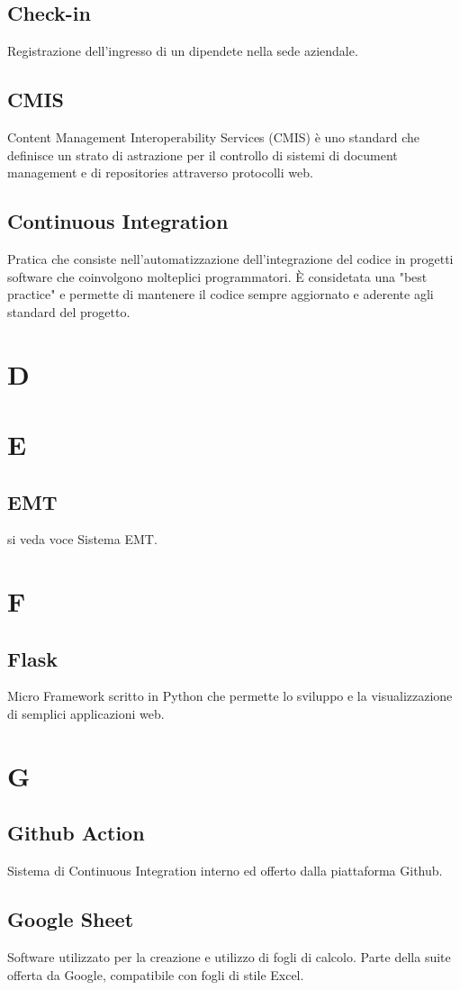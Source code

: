 \subsection{Check-in}
Registrazione dell'ingresso di un dipendete nella sede aziendale.
\subsection{CMIS}
Content Management Interoperability Services (CMIS) è uno standard che definisce un strato di astrazione per il controllo di
sistemi di document management e di repositories attraverso protocolli web.
\subsection{Continuous Integration}
Pratica che consiste nell'automatizzazione dell'integrazione del codice in progetti software che coinvolgono
molteplici programmatori. È considetata una "best practice" e permette di mantenere il codice sempre aggiornato e 
aderente agli standard del progetto.
\newpage
\section{D}
\section{E}
\subsection{EMT}
si veda voce Sistema EMT.
\newpage
\section{F}
\subsection{Flask}
Micro Framework scritto in Python che permette lo sviluppo e la visualizzazione di semplici applicazioni web.
\newpage
\section{G}
\subsection{Github Action}
Sistema di Continuous Integration interno ed offerto dalla piattaforma Github.
\subsection{Google Sheet}
Software utilizzato per la creazione e utilizzo di fogli di calcolo. Parte della suite offerta da Google, compatibile con fogli di stile Excel.
\newpage
